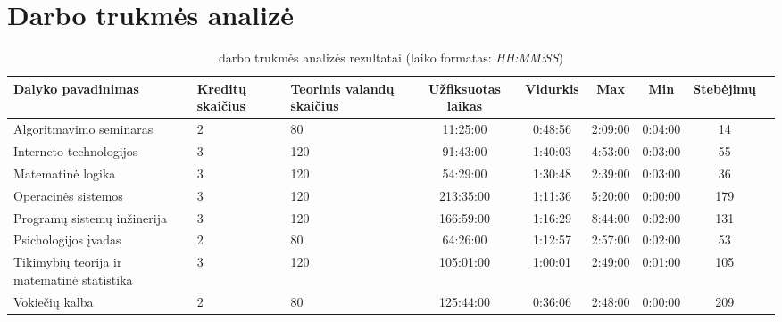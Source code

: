 \chapter{Darbo trukmės analizė}

\begin{sidewaystable}
\centering
\begin{tabular}{|l|p{50pt}|p{50pt}|c|c|c|c|c|c|}
  \hline
  {\bf Dalyko pavadinimas} & {\bf Kreditų skaičius} & {\bf Teorinis valandų skaičius} & {\bf Užfiksuotas laikas} & {\bf Vidurkis } & {\bf Max} & {\bf Min} & {\bf Stebėjimų}  \\
  \hline
  Algoritmavimo seminaras & 2 & 80 & 11:25:00 & 0:48:56 & 2:09:00 & 0:04:00 & 14 \\
  \hline
  Interneto technologijos & 3 & 120 & 91:43:00 & 1:40:03 & 4:53:00 & 0:03:00 & 55 \\
  \hline
  Matematinė logika & 3 & 120 & 54:29:00  & 1:30:48 & 2:39:00 & 0:03:00 & 36 \\
  \hline
  Operacinės sistemos & 3 & 120 & 213:35:00 & 1:11:36 & 5:20:00 & 0:00:00 & 179 \\
  \hline
  Programų sistemų inžinerija & 3 & 120 & 166:59:00 & 1:16:29 & 8:44:00 & 0:02:00 & 131 \\
  \hline
  Psichologijos įvadas & 2 & 80 & 64:26:00 & 1:12:57 & 2:57:00 & 0:02:00 & 53 \\
  \hline
  Tikimybių teorija ir matematinė statistika & 3 & 120 & 105:01:00 & 1:00:01 & 2:49:00 & 0:01:00 & 105 \\
  \hline
  Vokiečių kalba & 2 & 80 & 125:44:00 & 0:36:06 & 2:48:00 & 0:00:00 & 209 \\
  \hline
\end{tabular}
\caption{darbo trukmės analizės rezultatai (laiko formatas:
  \emph{HH:MM:SS})}
\end{sidewaystable}
